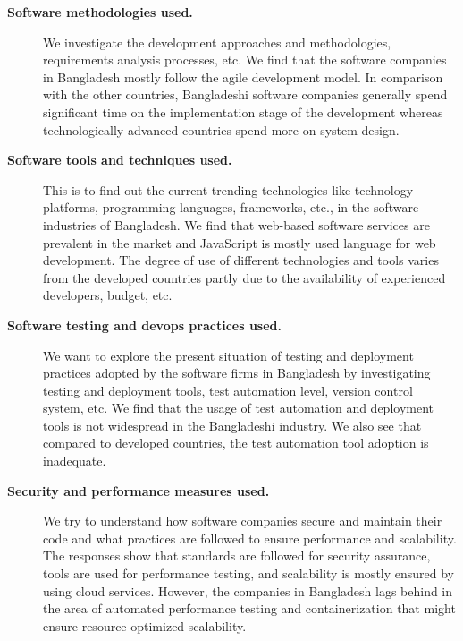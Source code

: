 \begin{description}
\item[\bf{Software methodologies used.}] We investigate the development
approaches and methodologies, requirements analysis processes, etc. We find that the software
companies in Bangladesh mostly follow the agile development model. In comparison with the
other countries, Bangladeshi software companies generally spend
significant time on the implementation stage of the development whereas
technologically advanced countries spend more on system design.
\item[\bf{Software tools and techniques used}.] This is to find out the current
trending technologies like technology platforms, programming languages,
frameworks, etc., in the software industries of Bangladesh. We find that web-based software services
are prevalent in the market and JavaScript is mostly used language for web
development. The degree of use of different technologies and tools varies
from the developed countries partly due to the availability of experienced developers,
budget, etc. 
\item[\bf{Software testing and devops practices used}.] We want to explore the
present situation of testing and deployment practices adopted by the software
firms in Bangladesh by investigating testing and deployment tools, test
automation level, version control system, etc. We find
that the usage of test automation and deployment tools is not widespread in the
Bangladeshi industry. We also see that compared
to developed countries, the test automation tool adoption is inadequate. 
\item[\bf{Security and performance measures used}.] We try to understand how
software companies secure and maintain their code and what practices are
followed to ensure performance and scalability. The responses show that
standards are followed for security assurance, tools are used for performance
testing, and scalability is mostly ensured by using cloud services. However, the companies in Bangladesh lags
behind in the area of automated performance testing and containerization that
might ensure resource-optimized scalability.
\end{description}

